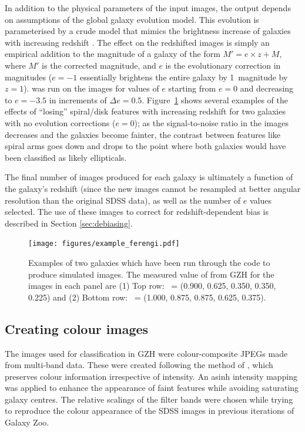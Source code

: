 \documentclass[a4paper,fleqn,usenatbib]{mnras}
\begin{document}
%

In addition to the physical parameters of the input images, the \ferengi{}
output depends on assumptions of the global galaxy evolution model.
This evolution is parameterised by a crude model that mimics the brightness increase of galaxies
with increasing redshift \citep[\eg,][]{lil98,lov12}. The effect on the
redshifted images is simply an empirical addition to the magnitude of a galaxy
of the form $M' = e\times z + M$, where $M'$ is the corrected magnitude, and
$e$ is the evolutionary correction in magnitudes ($e=-1$ essentially
brightens the entire galaxy by 1~magnitude by $z=1$). \ferengi{} was run on the images
for values of $e$ starting from $e=0$ and decreasing to $e=-3.5$ in increments
of $\Delta e = 0.5$. Figure~\ref{fig:exampleFERENGI} shows several examples
of the effects of ``losing'' spiral/disk features with increasing redshift
for two galaxies with no evolution corrections ($e=0$); as the signal-to-noise ratio in the images
decreases and the galaxies become fainter, the contrast between features
like spiral arms goes down and \ffeatures{} drops to the point where both
galaxies would have been classified as likely ellipticals. 

The final number of \ferengi{} images produced for each galaxy is ultimately a
function of the galaxy's redshift (since the new images cannot be resampled at
better angular resolution than the original SDSS data), as well as the number
of $e$ values selected. The use of these images to correct for redshift-dependent
bias is described in Section \ref{sec:debiasing}.

%

\begin{figure}
\center
\texttt{[image: figures/example\_ferengi.pdf]}
\caption{Examples of two galaxies which have been run through the \ferengi{}
code to produce simulated \hst{} images. The measured value of \ffeatures{}
from GZH for the images in each panel are (1) Top row: \ffeatures~= (0.900,
0.625, 0.350, 0.350, 0.225) and (2) Bottom row: \ffeatures~= (1.000, 0.875,
0.875, 0.625, 0.375). \label{fig:exampleFERENGI}}
\end{figure}

\subsection{Creating colour images}\label{ssec:images}

The images used for classification in GZH were colour-composite JPEGs made from
multi-band data. These were created following the method of \citet{lup04}, which
preserves colour information irrespective of intensity.  An asinh intensity
mapping was applied to enhance the appearance of faint features while avoiding
saturating galaxy centres. The relative scalings of the filter bands were
chosen while trying to reproduce the colour appearance of the SDSS images in
previous iterations of Galaxy Zoo.
\end{document}
